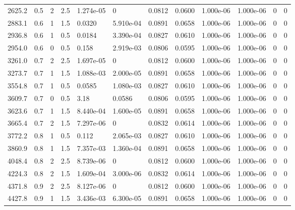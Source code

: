 \documentclass[preview]{standalone}
\begin{document}
{{\begin{tabular}{L{1.2cm}C{1.2cm} C{0.3cm}C{0.5cm} C{1.4cm}C{1.4cm} C{1.4cm}C{1.4cm} C{1.6cm}C{1.6cm} C{1.6cm}C{1.6cm}}
  2625.2  &   0.5  & 2     & 2.5 &  1.274e-05  & 0  &  0.0812&   0.0600& 1.000e-06 & 1.000e-06   &  0 & 0  \\ 
  2883.1  &   0.6  & 1     & 1.5 &  0.0320  & 5.910e-04  &  0.0891&   0.0658& 1.000e-06 & 1.000e-06   &  0 & 0  \\ 
  2936.8  &   0.6  & 1     & 0.5 &  0.0184  & 3.390e-04  &  0.0827&   0.0610& 1.000e-06 & 1.000e-06   &  0 & 0  \\ 
  2954.0  &   0.6  & 0     & 0.5 &  0.158  & 2.919e-03  &  0.0806&   0.0595& 1.000e-06 & 1.000e-06   &  0 & 0  \\ 
  3261.0  &   0.7  & 2     & 2.5 &  1.697e-05  & 0  &  0.0812&   0.0600& 1.000e-06 & 1.000e-06   &  0 & 0  \\ 
  3273.7  &   0.7  & 1     & 1.5 &  1.088e-03  & 2.000e-05  &  0.0891&   0.0658& 1.000e-06 & 1.000e-06   &  0 & 0  \\ 
  3554.8  &   0.7  & 1     & 0.5 &  0.0585  & 1.080e-03  &  0.0827&   0.0610& 1.000e-06 & 1.000e-06   &  0 & 0  \\ 
  3609.7  &   0.7  & 0     & 0.5 &  3.18  & 0.0586  &  0.0806&   0.0595& 1.000e-06 & 1.000e-06   &  0 & 0  \\ 
  3623.6  &   0.7  & 1     & 1.5 &  8.440e-04  & 1.600e-05  &  0.0891&   0.0658& 1.000e-06 & 1.000e-06   &  0 & 0  \\ 
  3665.4  &   0.7  & 2     & 1.5 &  7.297e-06  & 0  &  0.0832&   0.0614& 1.000e-06 & 1.000e-06   &  0 & 0  \\ 
  3772.2  &   0.8  & 1     & 0.5 &  0.112  & 2.065e-03  &  0.0827&   0.0610& 1.000e-06 & 1.000e-06   &  0 & 0  \\ 
  3860.9  &   0.8  & 1     & 1.5 &  7.357e-03  & 1.360e-04  &  0.0891&   0.0658& 1.000e-06 & 1.000e-06   &  0 & 0  \\ 
  4048.4  &   0.8  & 2     & 2.5 &  8.739e-06  & 0  &  0.0812&   0.0600& 1.000e-06 & 1.000e-06   &  0 & 0  \\ 
  4224.3  &   0.8  & 2     & 1.5 &  1.609e-04  & 3.000e-06  &  0.0832&   0.0614& 1.000e-06 & 1.000e-06   &  0 & 0  \\ 
  4371.8  &   0.9  & 2     & 2.5 &  8.127e-06  & 0  &  0.0812&   0.0600& 1.000e-06 & 1.000e-06   &  0 & 0  \\ 
  4427.8  &   0.9  & 1     & 1.5 &  3.436e-03  & 6.300e-05  &  0.0891&   0.0658& 1.000e-06 & 1.000e-06   &  0 & 0  \\ 
\hline 
\end{tabular} 

}}
\end{document}
